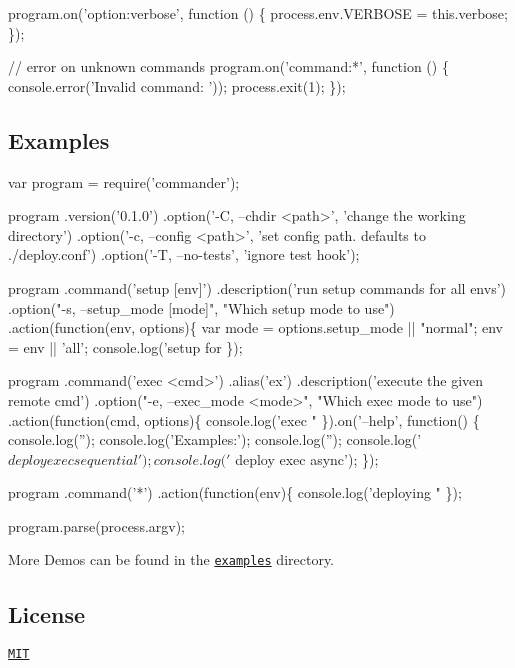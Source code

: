 \begin{DoxyCode}
program.on('option:verbose', function () \{
  process.env.VERBOSE = this.verbose;
\});

// error on unknown commands
program.on('command:*', function () \{
  console.error('Invalid command: %
       '));
  process.exit(1);
\});
\end{DoxyCode}


\subsection*{Examples}


\begin{DoxyCode}
var program = require('commander');

program
  .version('0.1.0')
  .option('-C, --chdir <path>', 'change the working directory')
  .option('-c, --config <path>', 'set config path. defaults to ./deploy.conf')
  .option('-T, --no-tests', 'ignore test hook');

program
  .command('setup [env]')
  .description('run setup commands for all envs')
  .option("-s, --setup\_mode [mode]", "Which setup mode to use")
  .action(function(env, options)\{
    var mode = options.setup\_mode || "normal";
    env = env || 'all';
    console.log('setup for %
  \});

program
  .command('exec <cmd>')
  .alias('ex')
  .description('execute the given remote cmd')
  .option("-e, --exec\_mode <mode>", "Which exec mode to use")
  .action(function(cmd, options)\{
    console.log('exec "%
  \}).on('--help', function() \{
    console.log('');
    console.log('Examples:');
    console.log('');
    console.log('  $ deploy exec sequential');
    console.log('  $ deploy exec async');
  \});

program
  .command('*')
  .action(function(env)\{
    console.log('deploying "%
  \});

program.parse(process.argv);
\end{DoxyCode}


More Demos can be found in the \href{https://github.com/tj/commander.js/tree/master/examples}{\tt examples} directory.

\subsection*{License}

\href{https://github.com/tj/commander.js/blob/master/LICENSE}{\tt M\+IT} 